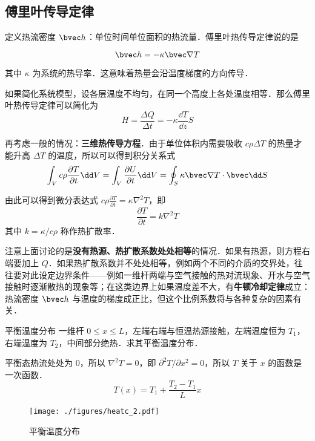 
\subsection{傅里叶传导定律}
定义热流密度 $\bvec h$：单位时间单位面积的热流量．傅里叶热传导定律说的是

\begin{equation}
\bvec h = -\kappa \bvec \nabla T
\end{equation}

其中 $\kappa$ 为系统的热导率．这意味着热量会沿温度梯度的方向传导．

如果简化系统模型，设各层温度不均匀，在同一个高度上各处温度相等．那么傅里叶热传导定律可以简化为
\begin{equation}
H=\frac{\Delta Q}{\Delta t}=-\kappa \frac{\dd T}{\dd z}S
\end{equation}

再考虑一般的情况：\textbf{三维热传导方程}．由于单位体积内需要吸收 $c\rho \Delta T$ 的热量才能升高 $\Delta T$ 的温度，所以可以得到积分关系式
\begin{equation}
\int_V c\rho \frac{\partial T}{\partial t} \dd V = \int_V \frac{\partial U}{\partial t} \dd V= \oint_S \kappa \bvec \nabla T \cdot \bvec \dd S
\end{equation}

由此可以得到微分表达式 $c\rho \frac{\partial T}{\partial t} = \kappa \nabla^2 T$，即
\begin{equation}
\frac{\partial T}{\partial t}=k\nabla^2 T
\end{equation}
其中 $k=\kappa/c\rho$ 称作热扩散率．

注意上面讨论的是\textbf{没有热源、热扩散系数处处相等}的情况．如果有热源，则方程右端要加上 $Q$．如果热扩散系数并不处处相等，例如两个不同的介质的交界处，往往要对此设定边界条件——例如一维杆两端与空气接触的热对流现象、开水与空气接触时逐渐散热的现象等；在这类边界上如果温度差不大，有\textbf{牛顿冷却定律}成立：热流密度 $\bvec h$ 与温度的梯度成正比，但这个比例系数将与各种复杂的因素有关．

\begin{example}{平衡温度分布}
一维杆 $0\le x\le L$，左端右端与恒温热源接触，左端温度恒为 $T_1$，右端温度为 $T_2$，中间部分绝热．求其平衡温度分布．

平衡态热流处处为 $0$，所以 $\nabla^2 T=0$，即 $\partial^2 T/\partial x^2=0$，所以 $T$ 关于 $x$ 的函数是一次函数．
\begin{equation}
T(x)=T_1+\frac{T_2-T_1}{L}x
\end{equation}

\begin{figure}[ht]
\centering
\texttt{[image: ./figures/heatc\_2.pdf]}
\caption{平衡温度分布} \label{heatc_fig2}
\end{figure}
\end{example}

